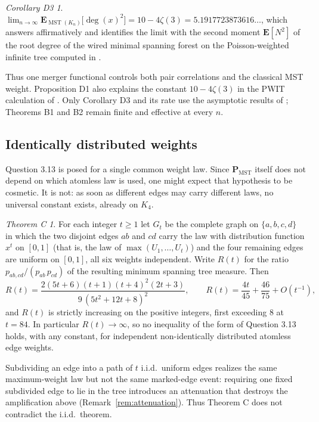 \documentclass[11pt,a4paper]{amsart}
\theoremstyle{plain}
\theoremstyle{definition}
\theoremstyle{remark}
\newtheorem*{theoremC}{Theorem C}
\newtheorem*{theoremD3}{Corollary D3}
\newcommand{\MST}{\operatorname{MST}}
\newcommand{\PMST}{\mathbf{P}_{\mathrm{MST}}}
\newcommand{\E}{\mathbf{E}}
\DeclareMathOperator{\dg}{deg}
\begin{document}
\begin{theoremD3}
$\displaystyle\lim_{n\to\infty}\E_{\MST(K_n)}\bigl[\dg(x)^2\bigr]=10-4\zeta(3)
=5.1917723873616\ldots$, which answers \cite[Question 3.8]{TZ} affirmatively and
identifies the limit with the second moment $\E[N^2]$ of the root degree of the
wired minimal spanning forest on the Poisson-weighted infinite tree computed in
\cite[Proposition 3.11]{TZ}.
\end{theoremD3}

Thus one merger functional controls both pair correlations and the classical
MST weight. Proposition D1 also explains the constant $10-4\zeta(3)$ in the
PWIT calculation of \cite{TZ}. Only Corollary D3 and its rate use the
asymptotic results of \cite{CFIJS,LiZhang}; Theorems B1 and B2 remain finite
and effective at every $n$.

\subsection{Identically distributed weights}
\label{ssec:introC}

Question 3.13 is posed for a single common weight law. Since $\PMST$ itself does
not depend on which atomless law is used, one might expect that hypothesis to be
cosmetic. It is not: as soon as different edges may carry different laws, no
universal constant exists, already on $K_4$.

\begin{theoremC}
For each integer $t\ge1$ let $G_t$ be the complete graph on $\{a,b,c,d\}$ in which the two
disjoint edges $ab$ and $cd$ carry the law with distribution function $x^t$ on
$[0,1]$ (that is, the law of $\max(U_1,\dots,U_t)$) and the four remaining edges
are uniform on $[0,1]$, all six weights independent. Write $R(t)$ for the ratio
$p_{ab,cd}/(p_{ab}\,p_{cd})$ of the resulting minimum spanning tree measure.
Then
\[
R(t)=\frac{2(5t+6)(t+1)(t+4)^2(2t+3)}{9\,(5t^2+12t+8)^2},
\qquad
R(t)=\frac{4t}{45}+\frac{46}{75}+O(t^{-1}) ,
\]
and $R(t)$ is strictly increasing on the positive integers, first exceeding
$8$ at $t=84$. In particular $R(t)\to\infty$, so no inequality of the form of Question
3.13 holds, with any constant, for independent non-identically distributed
atomless edge weights.
\end{theoremC}

Subdividing an edge into a path of $t$ i.i.d.\ uniform edges realizes the same
maximum-weight law but not the same marked-edge event: requiring one fixed
subdivided edge to lie in the tree introduces an attenuation that destroys the
amplification above (Remark~\ref{rem:attenuation}). Thus Theorem C does not
contradict the i.i.d.\ theorem.
\end{document}
